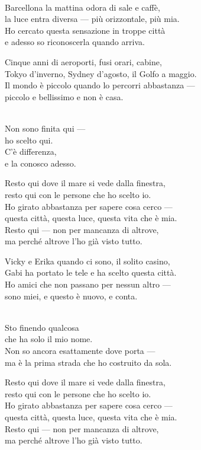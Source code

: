 \begin{lyrics}

\\
Barcellona la mattina odora di sale e caffè,\\
la luce entra diversa — più orizzontale, più mia.\\
Ho cercato questa sensazione in troppe città\\
e adesso so riconoscerla quando arriva.

Cinque anni di aeroporti, fusi orari, cabine,\\
Tokyo d'inverno, Sydney d'agosto, il Golfo a maggio.\\
Il mondo è piccolo quando lo percorri abbastanza —\\
piccolo e bellissimo e non è casa.

\\
Non sono finita qui —\\
ho scelto qui.\\
C'è differenza,\\
e la conosco adesso.

Resto qui dove il mare si vede dalla finestra,\\
resto qui con le persone che ho scelto io.\\
Ho girato abbastanza per sapere cosa cerco —\\
questa città, questa luce, questa vita che è mia.\\
Resto qui — non per mancanza di altrove,\\
ma perché altrove l'ho già visto tutto.

Vicky e Erika quando ci sono, il solito casino,\\
Gabi ha portato le tele e ha scelto questa città.\\
Ho amici che non passano per nessun altro —\\
sono miei, e questo è nuovo, e conta.

\\
Sto finendo qualcosa\\
che ha solo il mio nome.\\
Non so ancora esattamente dove porta —\\
ma è la prima strada che ho costruito da sola.

Resto qui dove il mare si vede dalla finestra,\\
resto qui con le persone che ho scelto io.\\
Ho girato abbastanza per sapere cosa cerco —\\
questa città, questa luce, questa vita che è mia.\\
Resto qui — non per mancanza di altrove,\\
ma perché altrove l'ho già visto tutto.


\end{lyrics}
